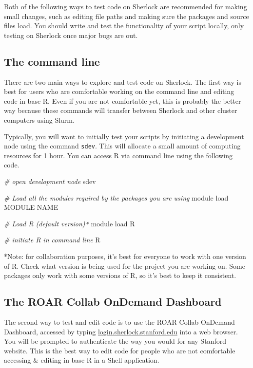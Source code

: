\documentclass[
]{book}
\newenvironment{Shaded}{\begin{snugshade}}{\end{snugshade}}
\newcommand{\CommentTok}[1]{\textcolor[rgb]{0.56,0.35,0.01}{\textit{#1}}}
\newcommand{\ExtensionTok}[1]{#1}
\newcommand{\NormalTok}[1]{#1}
\begin{document}
Both of the following ways to test code on Sherlock are recommended for making small changes, such as editing file paths and making sure the packages and source files load. You should write and test the functionality of your script locally, only testing on Sherlock once major bugs are out.

\subsection{The command line}\label{the-command-line}

There are two main ways to explore and test code on Sherlock. The first way is best for users who are comfortable working on the command line and editing code in base R. Even if you are not comfortable yet, this is probably the better way because these commands will transfer between Sherlock and other cluster computers using Slurm.

Typically, you will want to initially test your scripts by initiating a development node using the command \texttt{sdev}. This will allocate a small amount of computing resources for 1 hour. You can access R via command line using the following code.

\begin{Shaded}
\begin{Highlighting}[]
\CommentTok{\# open development node}
\ExtensionTok{sdev}

\CommentTok{\# Load all the modules required by the packages you are using}
\ExtensionTok{module}\NormalTok{ load MODULE NAME  }

\CommentTok{\# Load R (default version)*}
\ExtensionTok{module}\NormalTok{ load R }

\CommentTok{\# initiate R in command line}
\ExtensionTok{R}
\end{Highlighting}
\end{Shaded}

*Note: for collaboration purposes, it's best for everyone to work with one version of R. Check what version is being used for the project you are working on. Some packages only work with some versions of R, so it's best to keep it consistent.

\subsection{The ROAR Collab OnDemand Dashboard}\label{the-roar-collab-ondemand-dashboard}

The second way to test and edit code is to use the ROAR Collab OnDemand Dashboard, accessed by typing \url{login.sherlock.stanford.edu} into a web browser. You will be prompted to authenticate the way you would for any Stanford website. This is the best way to edit code for people who are not comfortable accessing \& editing in base R in a Shell application.
\end{document}
